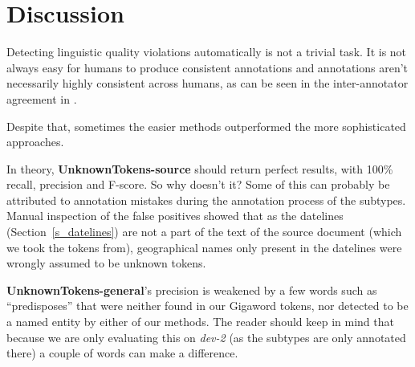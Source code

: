 \documentclass[a4paper,10pt]{scrartcl}
\theoremstyle{style}
\begin{document}




\section{Discussion}
\label{discussion}
Detecting linguistic quality violations automatically is not a trivial task. It is not always easy for humans to produce consistent annotations and annotations aren't necessarily highly consistent across humans, as can be seen in the inter-annotator agreement in \cite{friedrichlqvsumm}.

Despite that, sometimes the easier methods outperformed the more sophisticated approaches.

In theory, \textbf{UnknownTokens-source} should return perfect results, with 100\% recall, precision and F-score. So why doesn't it? Some of this can probably be attributed to annotation mistakes during the annotation process of the subtypes. Manual inspection of the false positives showed that as the datelines (Section~\ref{s_datelines}) are not a part of the text of the source document (which we took the tokens from), geographical names only present in the datelines were wrongly assumed to be unknown tokens.

\textbf{UnknownTokens-general}'s precision is weakened by a few words such as ``predisposes'' that were neither found in our Gigaword tokens, nor detected to be a named entity by either of our methods. The reader should keep in mind that because we are only evaluating this on \textit{dev-2} (as the subtypes are only annotated there) a couple of words can make a difference.
\end{document}
